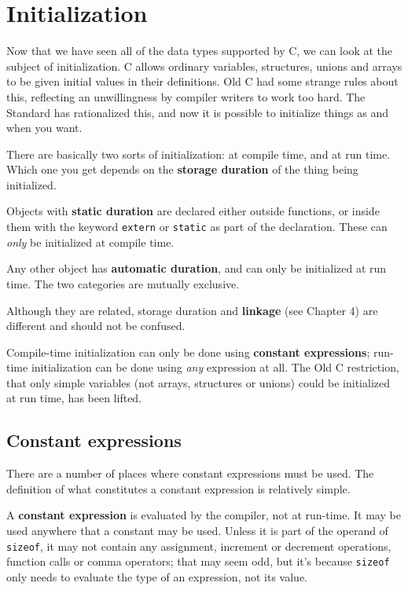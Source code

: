  
        \section{Initialization}
        

  

  Now that we have seen all of the data types supported by C, we can look at
   the subject of initialization. C allows ordinary variables, structures,
   unions and arrays to be given initial values in their definitions. Old C had
   some strange rules about this, reflecting an unwillingness by compiler
   writers to work too hard. The Standard has rationalized this, and now it is
   possible to initialize things as and when you want.


  There are basically two sorts of initialization: at compile time, and at
   run time. Which one you get depends on the \textbf{storage duration} of
   the thing being initialized.


  Objects with \textbf{static duration} are declared either outside
   functions, or inside them with the keyword \texttt{extern} or
   \texttt{static} as part of the declaration. These can \textit{only} be
   initialized at compile time.


  Any other object has \textbf{automatic duration}, and can only be
   initialized at run time. The two categories are mutually exclusive.


  Although they are related, storage duration and \textbf{linkage} (see
   Chapter 4) are different and should not be confused.


  Compile-time initialization can only be done using \textbf{constant
   expressions}; run-time initialization can be done using \textit{any}
   expression at all. The Old C restriction, that only simple variables (not
   arrays, structures or unions) could be initialized at run time, has been
   lifted.


  \subsection{Constant expressions}
   

   There are a number of places where constant expressions must be used. The
    definition of what constitutes a constant expression is relatively
    simple.


   A \textbf{constant expression} is evaluated by the compiler, not at
    run-time. It may be used anywhere that a constant may be used. Unless it is
    part of the operand of \texttt{sizeof}, it may not contain any
    assignment, increment or decrement operations, function calls or comma
    operators; that may seem odd, but it's because \texttt{sizeof} only
    needs to evaluate the type of an expression, not its value.


